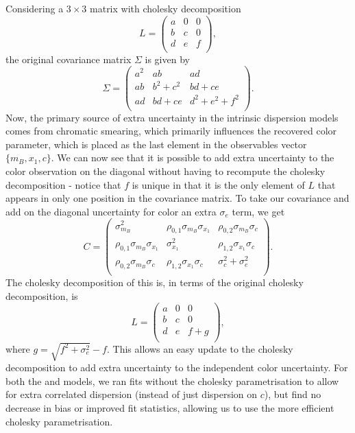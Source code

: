 \documentclass[a4paper,fleqn,usenatbib,manuscript]{emulateapj}
\newcommand{\gten}{\citetalias{Guy2010}}
\newcommand{\celeven}{\citetalias{Chotard2011}}
\begin{document}
Considering a $3\times3$ matrix with cholesky decomposition
\begin{equation}
L = \begin{pmatrix}
a & 0 & 0 \\ b & c & 0 \\ d & e & f \\
\end{pmatrix},
\end{equation}
the original covariance matrix $\Sigma$ is given by
\begin{equation}
\Sigma = \begin{pmatrix}
a^2 & ab & ad \\ ab & b^2 + c^2 & bd + ce \\ ad & bd + ce & d^2 + e^2 + f^2\\
\end{pmatrix}.
\end{equation}
Now, the primary source of extra uncertainty in the intrinsic dispersion models comes from chromatic smearing, which primarily influences the recovered color parameter, which is placed as the last element in the observables vector $\lbrace m_B, x_1, c\rbrace$. We can now see that it is possible to add extra uncertainty to the color observation on the diagonal without having to recompute the cholesky decomposition - notice that $f$ is unique in that it is the only element of $L$ that appears in only one position in the covariance matrix. To take our covariance and add on the diagonal uncertainty for color an extra $\sigma_e$ term, we get
\begin{equation}
C = \begin{pmatrix}
\sigma_{m_B}^2 & \rho_{0,1} \sigma_{m_B} \sigma_{x_1} & \rho_{0,2} \sigma_{m_B} \sigma_c \\
\rho_{0,1} \sigma_{m_B} \sigma_{x_1} & \sigma_{x_1}^2 & \rho_{1, 2} \sigma_{x_1} \sigma_c \\
\rho_{0,2} \sigma_{m_B} \sigma_c & \rho_{1, 2} \sigma_{x_1} \sigma_c &  \sigma_c^2 + \sigma_e^2 \\
\end{pmatrix}.
\end{equation}
The cholesky decomposition of this is, in terms of the original cholesky decomposition, is
\begin{equation}
L = \begin{pmatrix}
a & 0 & 0 \\ b & c & 0 \\ d & e & f + g \\
\end{pmatrix},
\end{equation}
where $g = \sqrt{f^2 + \sigma_e^2} - f$. This allows an easy update to the cholesky decomposition to add extra uncertainty to the independent color uncertainty. For both the {\gten} and {\celeven} models, we ran fits without the cholesky parametrisation to allow for extra correlated dispersion (instead of just dispersion on $c$), but find no decrease in bias or improved fit statistics, allowing us to use the more efficient cholesky parametrisation.
\end{document}
